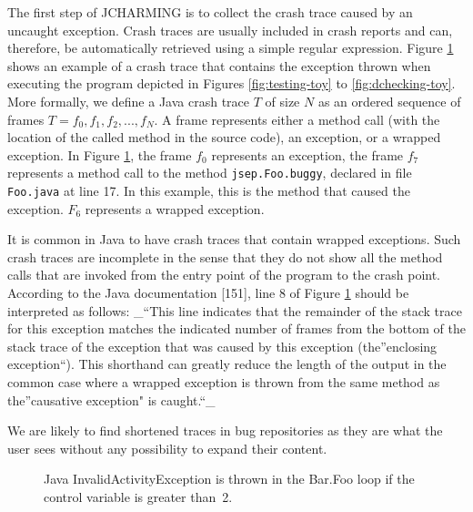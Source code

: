 \documentclass[12pt]{report}
\begin{document}
The first step of JCHARMING is to collect the crash trace caused by an
uncaught exception. Crash traces are usually included in crash reports
and can, therefore, be automatically retrieved using a simple regular
expression. Figure \ref{fig:jcarming-traces} shows an example of a crash
trace that contains the exception thrown when executing the program
depicted in Figures \ref{fig:testing-toy} to \ref{fig:dchecking-toy}.
More formally, we define a Java crash trace \(T\) of size \(N\) as an
ordered sequence of frames \(T={f_0, f_1, f_2, ..., f_N}\). A frame
represents either a method call (with the location of the called method
in the source code), an exception, or a wrapped exception. In Figure
\ref{fig:jcarming-traces}, the frame \(f_0\) represents an exception,
the frame \(f_7\) represents a method call to the method
\texttt{jsep.Foo.buggy}, declared in file \texttt{Foo.java} at line 17.
In this example, this is the method that caused the exception. \(F_6\)
represents a wrapped exception.

It is common in Java to have crash traces that contain wrapped
exceptions. Such crash traces are incomplete in the sense that they do
not show all the method calls that are invoked from the entry point of
the program to the crash point. According to the Java documentation
{[}151{]}, line 8 of Figure \ref{fig:jcarming-traces} should be
interpreted as follows: \_``This line indicates that the remainder of
the stack trace for this exception matches the indicated number of
frames from the bottom of the stack trace of the exception that was
caused by this exception (the''enclosing exception``). This shorthand
can greatly reduce the length of the output in the common case where a
wrapped exception is thrown from the same method as the''causative
exception" is caught.``\_

We are likely to find shortened traces in bug repositories as they are
what the user sees without any possibility to expand their content.

\begin{figure}
  \noindent{}
    \caption{Java InvalidActivityException is thrown in the Bar.Foo loop if the control variable is greater than~2.
    \label{fig:jcarming-traces}}
\end{figure}
\end{document}
